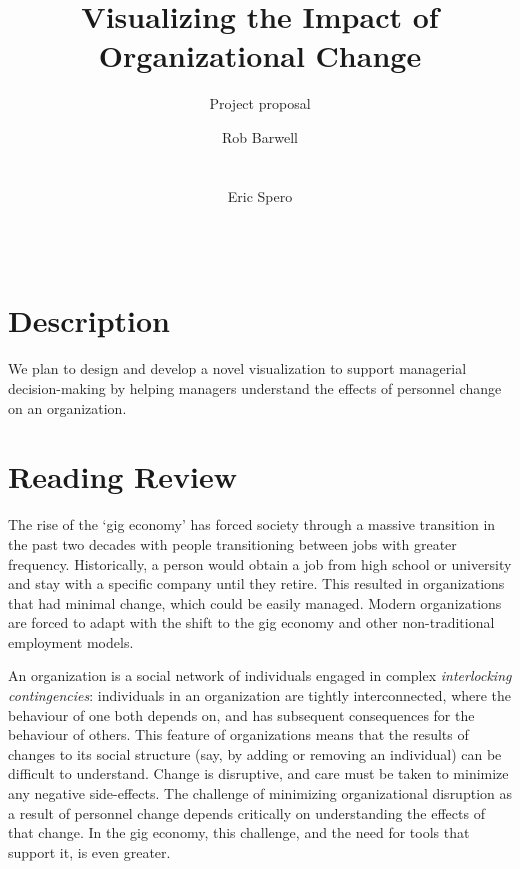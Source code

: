 \documentclass{soups}
\title{Visualizing the Impact of Organizational Change}
\subtitle{Project proposal}
\author{
\alignauthor
Rob Barwell\\ %
       \affaddr{Carleton University}\\
       \affaddr{Ottawa, Canada}\\
       \email{rob@barwell.ca}
\alignauthor
Eric Spero\\ %
       \affaddr{Carleton University}\\
       \affaddr{Ottawa, Canada }\\
       \email{eric.spero@carleton.ca}
}
\begin{document}
\nobalance

\makeatletter
\def\@copyrightspace{\relax}
\makeatother

\maketitle

\section{Description}

We plan to design and develop a novel visualization to support managerial decision-making by helping managers understand the effects of personnel change on an organization.

\section{Reading Review}

The rise of the \lq gig economy\rq{}\cite{de2015rise,friedman2014workers} has forced society through a massive transition in the past two decades with people transitioning between jobs with greater frequency.  Historically, a person would obtain a job from high school or university and stay with a specific company until they retire.  This resulted in organizations that had minimal change, which could be easily managed. Modern organizations are forced to adapt with the shift to the gig economy and other non-traditional employment models.  

An organization is a social network\cite{scott1988social} of individuals engaged in complex \emph{interlocking contingencies}\cite{glenn2006complexity}: individuals in an organization are tightly interconnected, where the behaviour of one both depends on, and has subsequent consequences for the behaviour of others\cite{glenn2006complexity}. This feature of organizations means that the results of changes to its social structure (say, by adding or removing an individual) can be difficult to understand. Change is disruptive, and care must be taken to minimize any negative side-effects. The challenge of minimizing organizational disruption as a result of personnel change depends critically on understanding the effects of that change. In the gig economy, this challenge, and the need for tools that support it, is even greater. 
\end{document}
